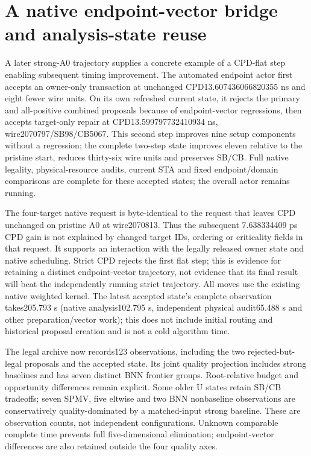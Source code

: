 
\section{A native endpoint-vector bridge and analysis-state reuse}
A later strong-A0 trajectory supplies a concrete example of a CPD-flat step enabling subsequent timing improvement. The automated endpoint actor first accepts an owner-only transaction at unchanged CPD13.607436066820355 ns and eight fewer wire units. On its own refreshed current state, it rejects the primary and all-positive combined proposals because of endpoint-vector regressions, then accepts target-only repair at CPD13.599797732410934 ns, wire2070797/SB98/CB5067. This second step improves nine setup components without a regression; the complete two-step state improves eleven relative to the pristine start, reduces thirty-six wire units and preserves SB/CB. Full native legality, physical-resource audits, current STA and fixed endpoint/domain comparisons are complete for these accepted states; the overall actor remains running.

The four-target native request is byte-identical to the request that leaves CPD unchanged on pristine A0 at wire2070813. Thus the subsequent 7.638334409 ps CPD gain is not explained by changed target IDs, ordering or criticality fields in that request. It supports an interaction with the legally released owner state and native scheduling. Strict CPD rejects the first flat step; this is evidence for retaining a distinct endpoint-vector trajectory, not evidence that its final result will beat the independently running strict trajectory. All moves use the existing native weighted kernel. The latest accepted state's complete observation takes205.793 s (native analysis102.795 s, independent physical audit65.488 s and other preparation/vector work); this does not include initial routing and historical proposal creation and is not a cold algorithm time.

The legal archive now records123 observations, including the two rejected-but-legal proposals and the accepted state. Its joint quality projection includes strong baselines and has seven distinct BNN frontier groups. Root-relative budget and opportunity differences remain explicit. Some older U states retain SB/CB tradeoffs; seven SPMV, five eltwise and two BNN nonbaseline observations are conservatively quality-dominated by a matched-input strong baseline. These are observation counts, not independent configurations. Unknown comparable complete time prevents full five-dimensional elimination; endpoint-vector differences are also retained outside the four quality axes.

